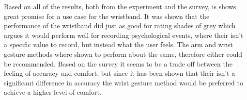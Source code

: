 Based on all of the results, both from the experiment and the survey, is shows great promise for a use case for the wristband. It was shown that the performance of the wristband did just as good for rating shades of grey which argues it would perform well for recording  psychological events, where their isn't a specific value to record, but instead what the user feels. The arm and wrist gesture methods where shown to perform about the same, therefore either could be recommended. Based on the survey it seems to be a trade off between the feeling of accuracy and comfort, but since it has been shown that their isn't a significant difference in accuracy the wrist gesture method would be preferred to achieve a higher level of comfort.